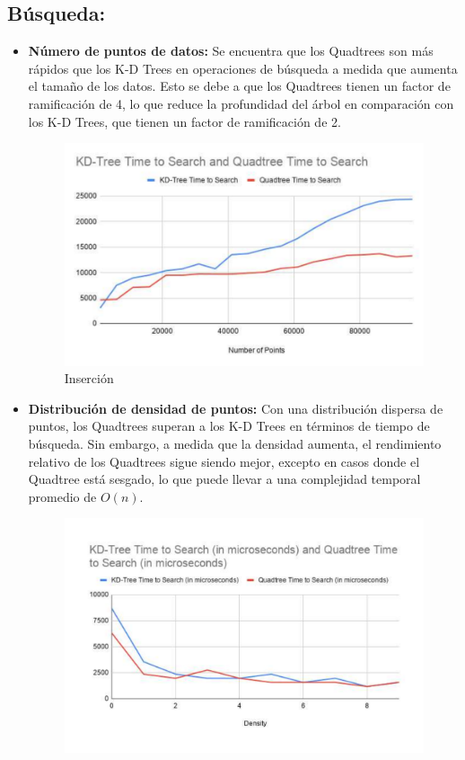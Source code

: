 \documentclass[9pt,a4paper,twoside]{rho-class/rho}
\begin{document}
        \subsection*{Búsqueda:}
            \begin{itemize}
            \item \textbf{Número de puntos de datos:} Se encuentra que los Quadtrees son más rápidos que los K-D Trees en operaciones de búsqueda a medida que aumenta el tamaño de los datos. Esto se debe a que los Quadtrees tienen un factor de ramificación de 4, lo que reduce la profundidad del árbol en comparación con los K-D Trees, que tienen un factor de ramificación de 2.\\
                \begin{figure}[h]
                \centering
                \includegraphics[width=\linewidth]{figures/Search1.pdf}
                \caption{Inserción \cite{amay12_spatialsearch}}
                \label{fig:representation_figure}
            \end{figure}
            \item \textbf{Distribución de densidad de puntos:} Con una distribución dispersa de puntos, los Quadtrees superan a los K-D Trees en términos de tiempo de búsqueda. Sin embargo, a medida que la densidad aumenta, el rendimiento relativo de los Quadtrees sigue siendo mejor, excepto en casos donde el Quadtree está sesgado, lo que puede llevar a una complejidad temporal promedio de $O(n)$.\\
                \begin{figure}[h]
                    \centering
                    \includegraphics[width=\linewidth]{figures/Search2-density.pdf}

\end{figure}
\end{itemize}
\end{document}

